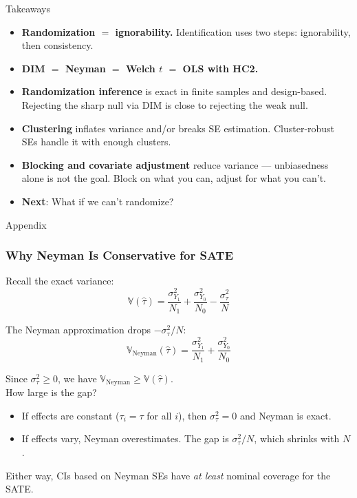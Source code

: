 \documentclass[xcolor=dvipsnames]{beamer}
\newcommand\V{\mathbb{V}}
\begin{document}
\begin{frame}{Takeaways}
\small
\begin{itemize}
\item \textbf{Randomization $=$ ignorability.}  Identification uses two steps: ignorability, then consistency.
\medskip
\item \textbf{DIM $=$ Neyman $=$ Welch $t$ $=$ OLS with HC2.}
\medskip
\item \textbf{Randomization inference} is exact in finite samples and design-based.  Rejecting the sharp null via DIM is close to rejecting the weak null.
\medskip
\item \textbf{Clustering} inflates variance and/or breaks SE estimation.  Cluster-robust SEs handle it with enough clusters.
\medskip
\item \textbf{Blocking and covariate adjustment} reduce variance --- unbiasedness alone is not the goal.  Block on what you can, adjust for what you can't.
\medskip
\item \textbf{Next}: What if we can't randomize?
\end{itemize}
\end{frame}


\appendix

\begin{frame}
\begin{center}
\Large Appendix
\end{center}
\end{frame}


\begin{frame}
\frametitle{Why Neyman Is Conservative for SATE}
\small
Recall the exact variance:
\[
\V(\hat\tau) = \frac{\sigma^2_{Y_1}}{N_1} + \frac{\sigma^2_{Y_0}}{N_0} - \frac{\sigma^2_{\tau}}{N}
\]

 The Neyman approximation drops $-\sigma^2_\tau / N$:
\[
\V_{\text{Neyman}}(\hat\tau) = \frac{\sigma^2_{Y_1}}{N_1} + \frac{\sigma^2_{Y_0}}{N_0}
\]

 Since $\sigma^2_\tau \geq 0$, we have $\V_{\text{Neyman}} \geq \V(\hat\tau)$.\\

\medskip
{} How large is the gap?
\footnotesize
\begin{itemize}
\item If effects are constant ($\tau_i = \tau$ for all $i$), then $\sigma^2_\tau = 0$ and Neyman is exact.
\item If effects vary, Neyman overestimates.  The gap is $\sigma^2_\tau/N$, which shrinks with $N$.
\end{itemize}
\small
{} Either way, CIs based on Neyman SEs have \textit{at least} nominal coverage for the SATE.
\end{frame}
\end{document}
